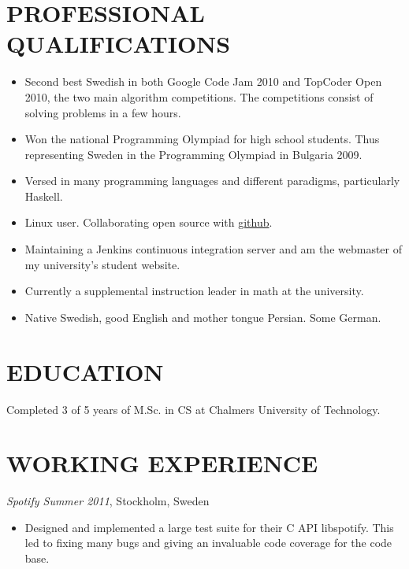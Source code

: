 \documentclass[11pt]{res} %
\begin{document}
\begin{resume}
                                               
\section{PROFESSIONAL QUALIFICATIONS} 
   \begin{itemize} %
   \item Second best Swedish in both
    Google Code Jam 2010 and TopCoder Open 2010,
    the two main algorithm competitions.
    The competitions consist of solving problems in a few hours.
   \item Won the national Programming Olympiad for high school students.
    Thus representing Sweden in the Programming Olympiad in Bulgaria 2009.
   \item Versed in many programming languages ​​and different paradigms,
    particularly Haskell.
   \item Linux user. Collaborating open source with \hyperref[https://github.com/Tarrasch]{github}.
   \item Maintaining a Jenkins continuous integration server 
    and am the webmaster of my university's student website.
   \item Currently a supplemental instruction leader in math at the university.
   \item Native Swedish, good English and mother tongue Persian. Some German.
 \end{itemize}
 
\section{EDUCATION} 
 \noindent Completed 3 of 5 years of M.Sc. in CS
  at Chalmers University of Technology.
 
\section{WORKING EXPERIENCE}
\emph{Spotify Summer 2011}, Stockholm, Sweden
\vspace{0.2in}
   \begin{itemize} %
   \item Designed and implemented a large test 
    suite for their C API libspotify.
    This led to fixing many bugs and giving an 
    invaluable code coverage for the code base.
 \end{itemize}



\end{resume}
\end{document}
